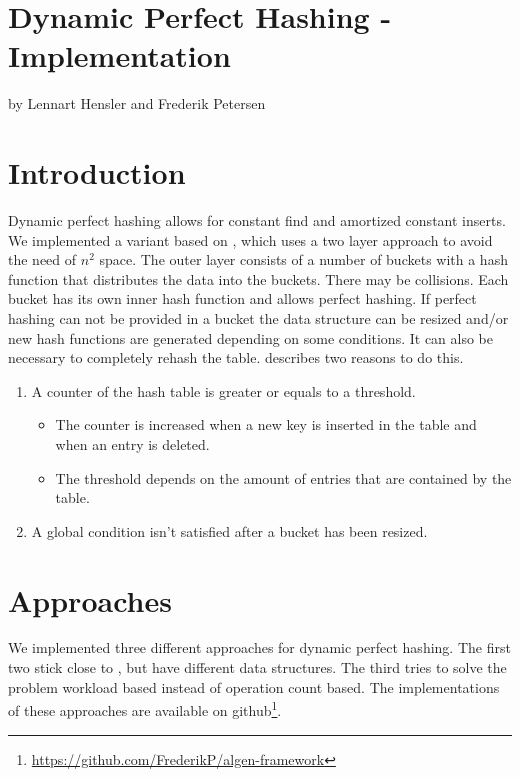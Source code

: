 \documentclass{article}
\begin{document}
\section*{Dynamic Perfect Hashing - Implementation}

by Lennart Hensler and Frederik Petersen

\section{Introduction}

Dynamic perfect hashing allows for constant find and amortized constant inserts.
We implemented a variant based on \cite{di94}, which uses a two layer approach
to avoid the need of $ n^2 $ space. The outer layer consists of a number of
buckets with a hash function that distributes the data into the buckets. There
may be collisions. Each bucket has its own inner hash function and allows
perfect hashing. If perfect hashing can not be provided in a bucket the data
structure can be resized and/or new hash functions are generated depending on
some conditions. It can also be necessary to completely rehash the table. \cite{di94} describes two reasons to do this.
\begin{enumerate}
  \item A counter of the hash table is greater or equals to a threshold.
  \begin{itemize}
    \item The counter is increased when a new key is inserted in the table and when an entry is deleted.
    \item The threshold depends on the amount of entries that are contained by the table.
  \end{itemize}
  \item A global condition isn't satisfied after a bucket has been resized.
\end{enumerate}

\section {Approaches}

We implemented three different approaches for dynamic perfect hashing. The first two stick close to \cite{di94}, but have different data structures. The third tries to solve the problem workload based instead of operation count based. The implementations of these approaches are available on github\footnote{\href{https://github.com/FrederikP/algen-framework}{https://github.com/FrederikP/algen-framework}}.
\end{document}
